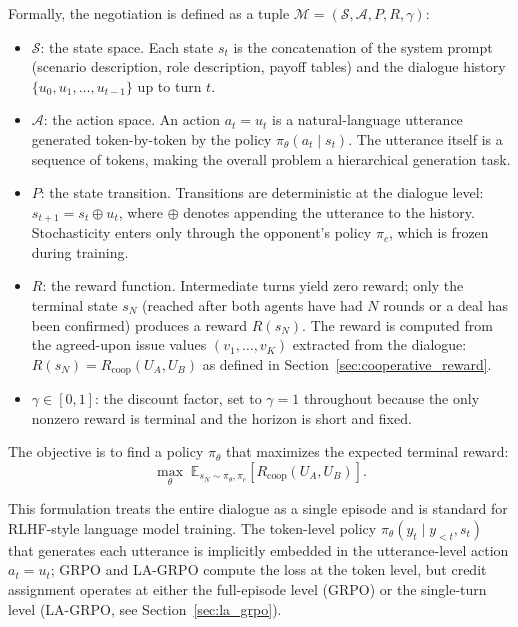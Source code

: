 \documentclass[12pt,a4paper]{article}
\begin{document}
Formally, the negotiation is defined as a tuple $\mathcal{M} = (\mathcal{S}, \mathcal{A}, P, R, \gamma)$:

\begin{itemize}
    \item $\mathcal{S}$: the state space. Each state $s_t$ is the concatenation of the system prompt (scenario description, role description, payoff tables) and the dialogue history $\{u_0, u_1, \ldots, u_{t-1}\}$ up to turn $t$.
    \item $\mathcal{A}$: the action space. An action $a_t = u_t$ is a natural-language utterance generated token-by-token by the policy $\pi_\theta(a_t \mid s_t)$. The utterance itself is a sequence of tokens, making the overall problem a hierarchical generation task.
    \item $P$: the state transition. Transitions are deterministic at the dialogue level: $s_{t+1} = s_t \oplus u_t$, where $\oplus$ denotes appending the utterance to the history. Stochasticity enters only through the opponent's policy $\pi_c$, which is frozen during training.
    \item $R$: the reward function. Intermediate turns yield zero reward; only the terminal state $s_N$ (reached after both agents have had $N$ rounds or a deal has been confirmed) produces a reward $R(s_N)$. The reward is computed from the agreed-upon issue values $(v_1, \ldots, v_K)$ extracted from the dialogue: $R(s_N) = R_{\text{coop}}(U_A, U_B)$ as defined in Section~\ref{sec:cooperative_reward}.
    \item $\gamma \in [0, 1]$: the discount factor, set to $\gamma = 1$ throughout because the only nonzero reward is terminal and the horizon is short and fixed.
\end{itemize}

The objective is to find a policy $\pi_\theta$ that maximizes the expected terminal reward:
\begin{equation}
\max_\theta \; \mathbb{E}_{s_N \sim \pi_\theta, \pi_c} \left[ R_{\text{coop}}(U_A, U_B) \right].
\end{equation}

This formulation treats the entire dialogue as a single episode and is standard for RLHF-style language model training. The token-level policy $\pi_\theta(y_t \mid y_{<t}, s_t)$ that generates each utterance is implicitly embedded in the utterance-level action $a_t = u_t$; GRPO and LA-GRPO compute the loss at the token level, but credit assignment operates at either the full-episode level (GRPO) or the single-turn level (LA-GRPO, see Section~\ref{sec:la_grpo}).
\end{document}
